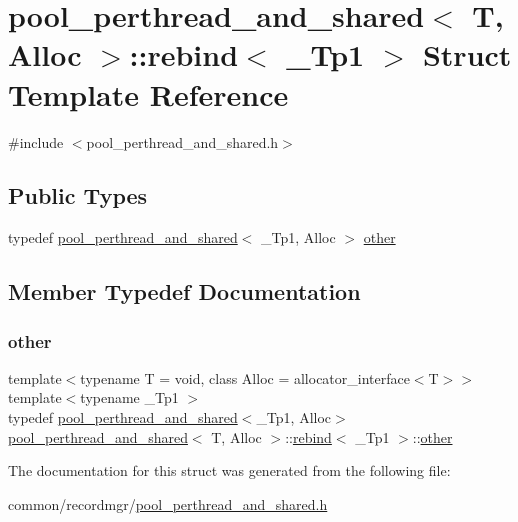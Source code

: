 \hypertarget{structpool__perthread__and__shared_1_1rebind}{}\section{pool\+\_\+perthread\+\_\+and\+\_\+shared$<$ T, Alloc $>$\+:\+:rebind$<$ \+\_\+\+Tp1 $>$ Struct Template Reference}
\label{structpool__perthread__and__shared_1_1rebind}


{\ttfamily \#include $<$pool\+\_\+perthread\+\_\+and\+\_\+shared.\+h$>$}

\subsection*{Public Types}
\begin{DoxyCompactItemize}
\item 
typedef \hyperlink{classpool__perthread__and__shared}{pool\+\_\+perthread\+\_\+and\+\_\+shared}$<$ \+\_\+\+Tp1, Alloc $>$ \hyperlink{structpool__perthread__and__shared_1_1rebind_ad68aed31072b109aaff5ba1a1950230a}{other}
\end{DoxyCompactItemize}


\subsection{Member Typedef Documentation}
\mbox{\label{structpool__perthread__and__shared_1_1rebind_ad68aed31072b109aaff5ba1a1950230a}} 
\subsubsection{\texorpdfstring{other}{other}}
{\footnotesize\ttfamily template$<$typename T  = void, class Alloc  = allocator\+\_\+interface$<$\+T$>$$>$ \\
template$<$typename \+\_\+\+Tp1 $>$ \\
typedef \hyperlink{classpool__perthread__and__shared}{pool\+\_\+perthread\+\_\+and\+\_\+shared}$<$\+\_\+\+Tp1, Alloc$>$ \hyperlink{classpool__perthread__and__shared}{pool\+\_\+perthread\+\_\+and\+\_\+shared}$<$ T, Alloc $>$\+::\hyperlink{structpool__perthread__and__shared_1_1rebind}{rebind}$<$ \+\_\+\+Tp1 $>$\+::\hyperlink{structpool__perthread__and__shared_1_1rebind_ad68aed31072b109aaff5ba1a1950230a}{other}}



The documentation for this struct was generated from the following file\+:\begin{DoxyCompactItemize}
\item 
common/recordmgr/\hyperlink{pool__perthread__and__shared_8h}{pool\+\_\+perthread\+\_\+and\+\_\+shared.\+h}\end{DoxyCompactItemize}
